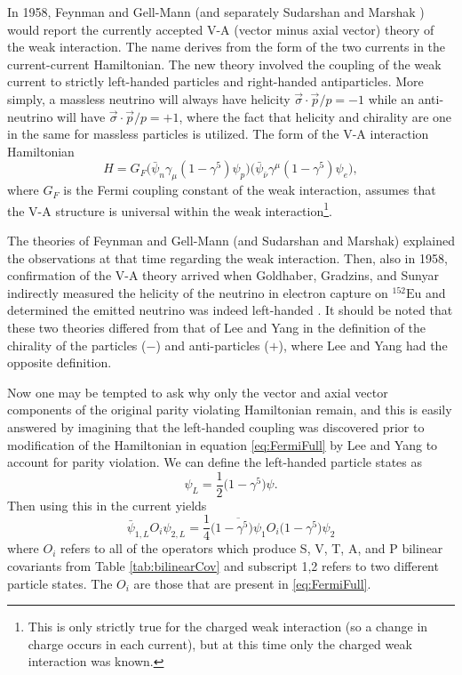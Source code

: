 In 1958, Feynman and Gell-Mann \cite{feynman1958} (and separately Sudarshan and Marshak
\cite{sudarshan1958}) would report the currently accepted V-A (vector minus axial vector)
theory of the weak interaction. The name derives from the form of the two currents in the
current-current Hamiltonian.
The new theory involved the coupling of the weak current to strictly left-handed particles and right-handed
antiparticles. More simply, a massless neutrino will always have helicity
$\vec{\sigma} \cdot \vec{p}/p = -1$ while an anti-neutrino will have $\vec{\sigma} \cdot \vec{p}/p = +1$,
where the fact that helicity and chirality are one in the same for massless particles is utilized.
The form of the V-A interaction Hamiltonian
%
\begin{equation}
  H = G_F \Big(\bar{\psi}_n \gamma_\mu(1-\gamma^5)\psi_p \Big)\Big(\bar{\psi}_{\bar{\nu}} \gamma^\mu(1-\gamma^5)\psi_e \Big),
  \label{eq:VminusA}
\end{equation}
%
where $G_F$ is the Fermi coupling constant of the weak interaction,
assumes that the V-A structure is universal within the weak interaction\footnote{This is
  only strictly true for the charged weak interaction (so a change in charge occurs in each current),
  but at this time only the charged weak interaction
  was known.}.

The theories of Feynman and Gell-Mann (and Sudarshan and Marshak)
explained the observations at that time
regarding the weak interaction. Then, also in 1958, confirmation of the V-A theory arrived when
Goldhaber, Gradzins, and Sunyar indirectly measured
the helicity of the neutrino in electron capture on $^{152}\mathrm{Eu}$ and determined the
emitted neutrino was indeed left-handed
\cite{goldhaber1958,greiner1996}. It should be noted that these two theories differed from that of
Lee and Yang in the definition of the chirality of the particles ($-$) and anti-particles ($+$), where
Lee and Yang had the opposite definition.

Now one may be tempted to ask why only the vector and axial vector components of the original
parity violating Hamiltonian remain, and this is easily answered by imagining that the
left-handed coupling was discovered prior to modification of the Hamiltonian in equation
\ref{eq:FermiFull} by Lee and Yang to account for parity violation. We can define the left-handed
particle states as 
%
\begin{equation}
  \psi_L = \frac{1}{2}\big(1-\gamma^5\big)\psi.
\end{equation}
%
Then using this in the current yields
%
\begin{equation}
  \bar{\psi}_{1,L} O_i \psi_{2,L} = \frac{1}{4}\overline{\big(1-\gamma^5\big)\psi_{1}} O_i \big(1-\gamma^5\big)\psi_{2}
\end{equation}
%
where $O_i$ refers to all of the operators which produce S, V, T, A, and P bilinear covariants
from Table \ref{tab:bilinearCov} and subscript 1,2 refers to two different particle states.
The $O_i$ are those that are present in \ref{eq:FermiFull}.

